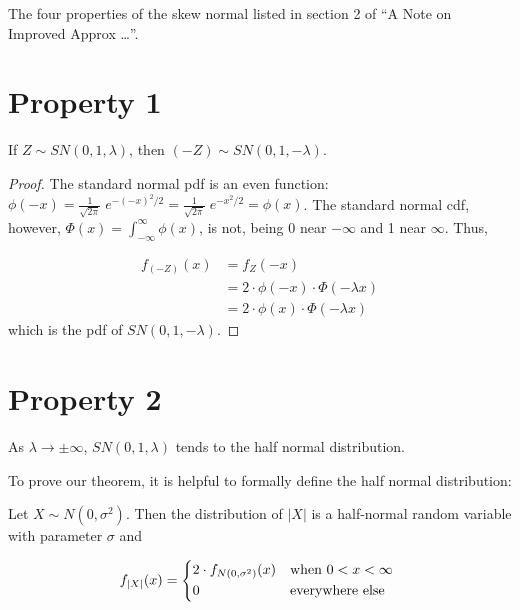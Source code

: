 \documentclass{article}
\begin{document}
The four properties of the skew normal listed in section 2 of ``A Note on Improved Approx \ldots''.

\section{Property 1}
\begin{thm*}
  If $Z \sim SN(0, 1, \lambda)$, then $(-Z) \sim SN(0, 1, -\lambda)$.
\end{thm*}

\begin{proof}
  
  The standard normal pdf is an even function: $\phi(-x) = \frac{1}{\sqrt{2\pi}}\;e^{-(-x)^2/2} =
  \frac{1}{\sqrt{2\pi}}\;e^{-x^2/2} = \phi(x)$. The standard normal cdf, however, $\Phi(x) =
  \int_{-\infty}^\infty \phi(x)$, is not, being 0 near $-\infty$ and 1 near $\infty$. Thus,
  
  \begin{align*}
    f_{(-Z)}(x) &= f_Z(-x) \\
    & = 2 \cdot \phi(-x) \cdot \Phi (-\lambda x) \\
    & = 2 \cdot \phi(x) \cdot \Phi (-\lambda x)
  \end{align*}
  which is the pdf of $SN(0, 1, -\lambda)$.
\end{proof}

\section{Property 2}
\begin{thm*}
  As $\lambda \to \pm \infty$, $SN(0, 1, \lambda)$ tends to the half normal distribution.
\end{thm*}

To prove our theorem, it is helpful to formally define the half normal distribution:

\begin{lemma*}
  Let $X \sim N(0, \sigma^2)$. Then the distribution of $|X|$ is a half-normal random variable
  with parameter $\sigma$ and

  \[
  f_{|X|}(x) =
  \begin{dcases*}
    2 \cdot f_{N(0, \sigma^2)}(x) & when $0 < x < \infty$ \\
    0 & everywhere else
  \end{dcases*}
  \]
\end{lemma*}
\end{document}
